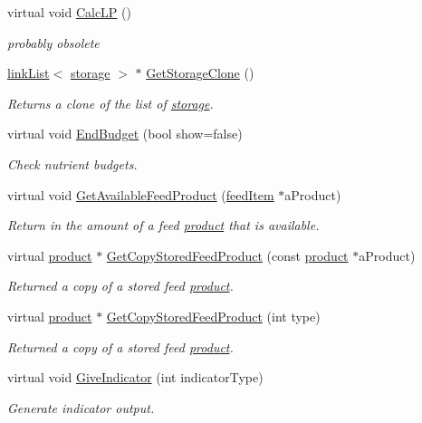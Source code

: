 \begin{DoxyCompactItemize}
virtual void \hyperlink{classbarn_storage_a5c4a88279dcfa290b08db30d075e1756}{CalcLP} ()
\begin{DoxyCompactList}\small\item\em probably obsolete \item\end{DoxyCompactList}\item 
\hyperlink{classlink_list}{linkList}$<$ \hyperlink{classstorage}{storage} $>$ $\ast$ \hyperlink{classbarn_storage_a8d42662925ead9f3bdd9dfdd3ade9c46}{GetStorageClone} ()
\begin{DoxyCompactList}\small\item\em Returns a clone of the list of \hyperlink{classstorage}{storage}. \item\end{DoxyCompactList}\item 
virtual void \hyperlink{classbarn_storage_a0b4aeb51dd52aff5b8f543528f6bd45c}{EndBudget} (bool show=false)
\begin{DoxyCompactList}\small\item\em Check nutrient budgets. \item\end{DoxyCompactList}\item 
virtual void \hyperlink{classbarn_storage_a679ed8112c05c5bdbda203a65dcf6cf8}{GetAvailableFeedProduct} (\hyperlink{classfeed_item}{feedItem} $\ast$aProduct)
\begin{DoxyCompactList}\small\item\em Return in the amount of a feed \hyperlink{classproduct}{product} that is available. \item\end{DoxyCompactList}\item 
virtual \hyperlink{classproduct}{product} $\ast$ \hyperlink{classbarn_storage_aecf6b68a80f1e0f0b8f2f8d9eaed63d1}{GetCopyStoredFeedProduct} (const \hyperlink{classproduct}{product} $\ast$aProduct)
\begin{DoxyCompactList}\small\item\em Returned a copy of a stored feed \hyperlink{classproduct}{product}. \item\end{DoxyCompactList}\item 
virtual \hyperlink{classproduct}{product} $\ast$ \hyperlink{classbarn_storage_a181a94edd100406b138a55c77aa15c79}{GetCopyStoredFeedProduct} (int type)
\begin{DoxyCompactList}\small\item\em Returned a copy of a stored feed \hyperlink{classproduct}{product}. \item\end{DoxyCompactList}\item 
virtual void \hyperlink{classbarn_storage_add4a5961a82e36e01d6905e01ac274de}{GiveIndicator} (int indicatorType)
\begin{DoxyCompactList}\small\item\em Generate indicator output. \item\end{DoxyCompactList}\end{DoxyCompactItemize}
